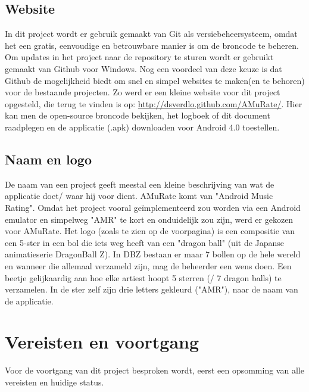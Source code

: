 \documentclass[11pt,a4paper]{article}
\begin{document}
	\subsection{Website}
		In dit project wordt er gebruik gemaakt van Git als versiebeheersysteem, omdat het een gratis, eenvoudige en betrouwbare manier is om de broncode te beheren. Om updates in het project naar de repository te sturen wordt er gebruikt gemaakt van Github voor Windows. Nog een voordeel van deze keuze is dat Github de mogelijkheid biedt om snel en simpel websites te maken(en te behoren) voor de bestaande projecten. Zo werd er een kleine website voor dit project opgesteld, die terug te vinden is op: \url{http://dsverdlo.github.com/AMuRate/}. Hier kan men de open-source broncode bekijken, het logboek of dit document raadplegen en de applicatie (.apk) downloaden voor Android 4.0 toestellen.
		
	\subsection{Naam en logo}
		De naam van een project geeft meestal een kleine beschrijving van wat de applicatie doet/ waar hij voor dient. AMuRate komt van "Android Music Rating". Omdat het project vooral geïmplementeerd zou worden via een Android emulator en simpelweg "AMR" te kort en onduidelijk zou zijn, werd er gekozen voor AMuRate. Het logo (zoals te zien op de voorpagina) is een compositie van een 5-ster in een bol die iets weg heeft van een "dragon ball" (uit de Japanse animatieserie DragonBall Z). In DBZ bestaan er maar 7 bollen op de hele wereld en wanneer die allemaal verzameld zijn, mag de beheerder een wens doen. Een beetje gelijkaardig aan hoe elke artiest hoopt 5 sterren (/ 7 dragon balls) te verzamelen. 
	In de ster zelf zijn drie letters gekleurd ("AMR"), naar de naam van de applicatie.
\newpage %
\section{Vereisten en voortgang}
Voor de voortgang van dit project besproken wordt, eerst een opsomming van alle vereisten en huidige status. \\
\end{document}
